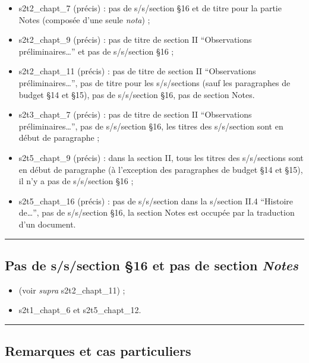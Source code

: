 \begin{itemize}
\item
  s2t2\_chapt\_7 (précis) : pas de s/s/section §16 et de titre pour la
  partie Notes (composée d'une seule \emph{nota}) ;
\item
  s2t2\_chapt\_9 (précis) : pas de titre de section II ``Observations
  préliminaires\ldots{}'' et pas de s/s/section §16 ;
\item
  s2t2\_chapt\_11 (précis) : pas de titre de section II ``Observations
  préliminaires\ldots{}'', pas de titre pour les s/s/sections (sauf les
  paragraphes de budget §14 et §15), pas de s/s/section §16, pas de
  section Notes.
\item
  s2t3\_chapt\_7 (précis) : pas de titre de section II ``Observations
  préliminaires\ldots{}'', pas de s/s/section §16, les titres des
  s/s/section sont en début de paragraphe ;
\item
  s2t5\_chapt\_9 (précis) : dans la section II, tous les titres des
  s/s/sections sont en début de paragraphe (à l'exception des
  paragraphes de budget §14 et §15), il n'y a pas de s/s/section §16 ;
\item
  s2t5\_chapt\_16 (précis) : pas de s/s/section dans la s/section II.4
  ``Histoire de\ldots{}'', pas de s/s/section §16, la section Notes est
  occupée par la traduction d'un document.
\end{itemize}

\begin{center}\rule{3in}{0.4pt}\end{center}

\subsection{Pas de s/s/section §16 et pas de section
\textit{Notes}}\label{pas-de-sssection-16-et-pas-de-section-notes}

\begin{itemize}
\item
  (voir \emph{supra} s2t2\_chapt\_11) ;
\item
  s2t1\_chapt\_6 et s2t5\_chapt\_12.
\end{itemize}

\begin{center}\rule{3in}{0.4pt}\end{center}

\subsection{Remarques et cas
particuliers}\label{remarques-et-cas-particuliers}

